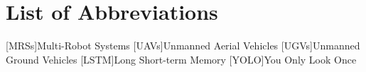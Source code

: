 \cleardoublepage
{}
\tableofcontents
\clearpage

\cleardoublepage
{}
{}
\chapter*{List of Abbreviations}
\begin{acronym}[\hspace{3cm}]
  [MRSs]{Multi-Robot Systems}
  [UAVs]{Unmanned Aerial Vehicles}
  [UGVs]{Unmanned Ground Vehicles}
  [LSTM]{Long Short-term Memory}
  [YOLO]{You Only Look Once}
\end{acronym}
\clearpage

\cleardoublepage
{}
{}
\listoffigures
\clearpage

\cleardoublepage
{}
{}
\listoftables
\clearpage
